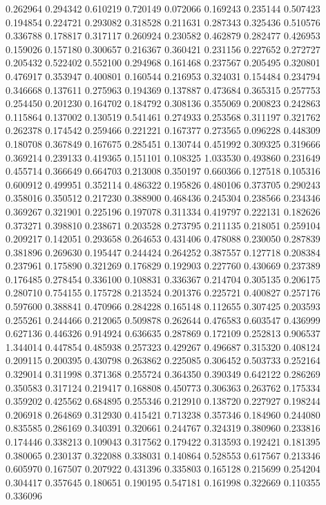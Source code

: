 0.262964
0.294342
0.610219
0.720149
0.072066
0.169243
0.235144
0.507423
0.194854
0.224721
0.293082
0.318528
0.211631
0.287343
0.325436
0.510576
0.336788
0.178817
0.317117
0.260924
0.230582
0.462879
0.282477
0.426953
0.159026
0.157180
0.300657
0.216367
0.360421
0.231156
0.227652
0.272727
0.205432
0.522402
0.552100
0.294968
0.161468
0.237567
0.205495
0.320801
0.476917
0.353947
0.400801
0.160544
0.216953
0.324031
0.154484
0.234794
0.346668
0.137611
0.275963
0.194369
0.137887
0.473684
0.365315
0.257753
0.254450
0.201230
0.164702
0.184792
0.308136
0.355069
0.200823
0.242863
0.115864
0.137002
0.130519
0.541461
0.274933
0.253568
0.311197
0.321762
0.262378
0.174542
0.259466
0.221221
0.167377
0.273565
0.096228
0.448309
0.180708
0.367849
0.167675
0.285451
0.130744
0.451992
0.309325
0.319666
0.369214
0.239133
0.419365
0.151101
0.108325
1.033530
0.493860
0.231649
0.455714
0.366649
0.664703
0.213008
0.350197
0.660366
0.127518
0.105316
0.600912
0.499951
0.352114
0.486322
0.195826
0.480106
0.373705
0.290243
0.358016
0.350512
0.217230
0.388900
0.468436
0.245304
0.238566
0.234346
0.369267
0.321901
0.225196
0.197078
0.311334
0.419797
0.222131
0.182626
0.373271
0.398810
0.238671
0.203528
0.273795
0.211135
0.218051
0.259104
0.209217
0.142051
0.293658
0.264653
0.431406
0.478088
0.230050
0.287839
0.381896
0.269630
0.195447
0.244424
0.264252
0.387557
0.127718
0.208384
0.237961
0.175890
0.321269
0.176829
0.192903
0.227760
0.430669
0.237389
0.176485
0.278454
0.336100
0.108831
0.336367
0.214704
0.305135
0.206175
0.280710
0.754155
0.175728
0.213524
0.201376
0.225721
0.400827
0.257176
0.597600
0.388841
0.470966
0.284228
0.165148
0.112655
0.307425
0.203593
0.255261
0.244466
0.212065
0.509878
0.262644
0.476583
0.603547
0.436999
0.627136
0.446326
0.914924
0.636635
0.287869
0.172109
0.252813
0.906537
1.344014
0.447854
0.485938
0.257323
0.429267
0.496687
0.315320
0.408124
0.209115
0.200395
0.430798
0.263862
0.225085
0.306452
0.503733
0.252164
0.329014
0.311998
0.371368
0.255724
0.364350
0.390349
0.642122
0.286269
0.350583
0.317124
0.219417
0.168808
0.450773
0.306363
0.263762
0.175334
0.359202
0.425562
0.684895
0.255346
0.212910
0.138720
0.227927
0.198244
0.206918
0.264869
0.312930
0.415421
0.713238
0.357346
0.184960
0.244080
0.835585
0.286169
0.340391
0.320661
0.244767
0.324319
0.380960
0.233816
0.174446
0.338213
0.109043
0.317562
0.179422
0.313593
0.192421
0.181395
0.380065
0.230137
0.322088
0.338031
0.140864
0.528553
0.617567
0.213346
0.605970
0.167507
0.207922
0.431396
0.335803
0.165128
0.215699
0.254204
0.304417
0.357645
0.180651
0.190195
0.547181
0.161998
0.322669
0.110355
0.336096
